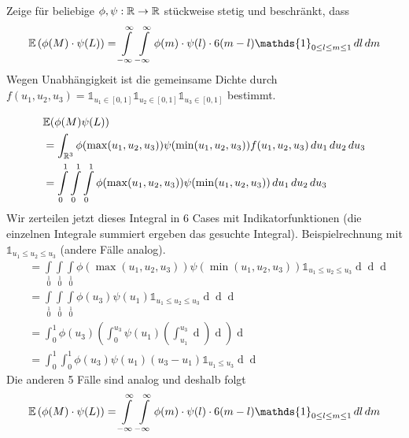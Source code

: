 Zeige für beliebige $\phi, \psi: \mathbb{R} \to \mathbb{R}$ stückweise stetig und beschränkt, dass 
\[\E\left(\phi(M)\cdot\psi(L)\right) = \int\limits_{-\infty}\limits^\infty \int\limits_{-\infty}\limits^\infty \phi(m) \cdot \psi(l) \cdot6(m-l)\mathds{1}_{0\leq l\leq m \leq 1}\mathop{dl}\mathop{dm}\]
Wegen Unabhängigkeit ist die gemeinsame Dichte durch $f(u_1, u_2, u_3) = \mathds{1}_{u_1 \in [0,1]}\mathds{1}_{u_2 \in [0,1]}\mathds{1}_{u_3 \in [0,1]}$ bestimmt.

\begin{align*}
	&\mathbb{E}(\phi(M)\psi(L)) \\
	&= \int_{\mathbb{R}^3} \phi(\max(u_1, u_2, u_3))\psi(\min(u_1, u_2, u_3)) f(u_1, u_2, u_3) \mathop{du_1}\mathop{du_2}\mathop{du_3}\\
	&= \int\limits_0\limits^1 \int\limits_0\limits^1 \int\limits_0\limits^1 \phi(\max(u_1, u_2, u_3))\psi(\min(u_1, u_2, u_3)) \mathop{du_1}\mathop{du_2}\mathop{du_3}
\end{align*}
Wir zerteilen jetzt dieses Integral in 6 Cases mit Indikatorfunktionen (die einzelnen Integrale summiert ergeben das gesuchte Integral). 
Beispielrechnung mit $\mathds{1}_{u_1 \leq u_2 \leq u_3}$ (andere Fälle analog).
\begin{align*}
	&= \int\limits_0\limits^1 \int\limits_0\limits^1 \int\limits_0\limits^1 \phi(\max(u_1, u_2, u_3))\psi(\min(u_1, u_2, u_3)) \mathds{1}_{u_1 \leq u_2 \leq u_3} \mathop{du_1}\mathop{du_2}\mathop{du_3}\\
	&= \int\limits_0\limits^1 \int\limits_0\limits^1 \int\limits_0\limits^1 \phi(u_3)\psi(u_1) \mathds{1}_{u_1 \leq u_2 \leq u_3} \mathop{du_1}\mathop{du_2}\mathop{du_3}\\
	&= \int_0^1 \phi(u_3) \left(\int_0^{u_3}\psi(u_1)\left(\int_{u_1}^{u_3}\mathop{du_2}\right)\mathop{du_1}\right)\mathop{du_3}\\
	&= \int_0^1\int_0^1 \phi(u_3)\psi(u_1)(u_3-u_1)\mathds{1}_{u_1\leq u_3}\mathop{du_1}\mathop{du_3}
\end{align*}
Die anderen 5 Fälle sind analog und deshalb folgt
\[\E\left(\phi(M)\cdot\psi(L)\right) = \int\limits_{-\infty}\limits^\infty \int\limits_{-\infty}\limits^\infty \phi(m) \cdot \psi(l) \cdot6(m-l)\mathds{1}_{0\leq l\leq m \leq 1}\mathop{dl}\mathop{dm}\]